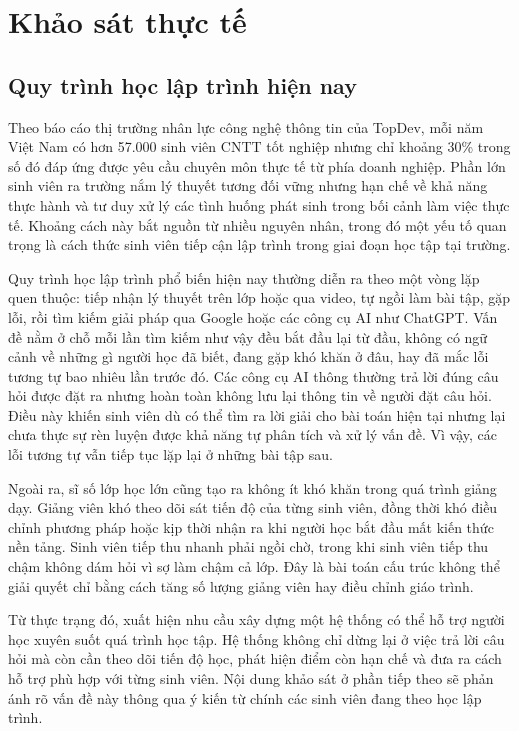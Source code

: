 \documentclass[../main.tex]{subfiles}
\begin{document}
\section{Khảo sát thực tế}

\subsection{Quy trình học lập trình hiện nay}

Theo báo cáo thị trường nhân lực công nghệ thông tin của TopDev, mỗi năm Việt Nam có hơn 57.000 sinh viên CNTT tốt nghiệp nhưng chỉ khoảng 30\% trong số đó đáp ứng được yêu cầu chuyên môn thực tế từ phía doanh nghiệp. Phần lớn sinh viên ra trường nắm lý thuyết tương đối vững nhưng hạn chế về khả năng thực hành và tư duy xử lý các tình huống phát sinh trong bối cảnh làm việc thực tế. Khoảng cách này bắt nguồn từ nhiều nguyên nhân, trong đó một yếu tố quan trọng là cách thức sinh viên tiếp cận lập trình trong giai đoạn học tập tại trường.

Quy trình học lập trình phổ biến hiện nay thường diễn ra theo một vòng lặp quen thuộc: tiếp nhận lý thuyết trên lớp hoặc qua video, tự ngồi làm bài tập, gặp lỗi, rồi tìm kiếm giải pháp qua Google hoặc các công cụ AI như ChatGPT. Vấn đề nằm ở chỗ mỗi lần tìm kiếm như vậy đều bắt đầu lại từ đầu, không có ngữ cảnh về những gì người học đã biết, đang gặp khó khăn ở đâu, hay đã mắc lỗi tương tự bao nhiêu lần trước đó. Các công cụ AI thông thường trả lời đúng câu hỏi được đặt ra nhưng hoàn toàn không lưu lại thông tin về người đặt câu hỏi. Điều này khiến sinh viên dù có thể tìm ra lời giải cho bài toán hiện tại nhưng lại chưa thực sự rèn luyện được khả năng tự phân tích và xử lý vấn đề. Vì vậy, các lỗi tương tự vẫn tiếp tục lặp lại ở những bài tập sau.

Ngoài ra, sĩ số lớp học lớn cũng tạo ra không ít khó khăn trong quá trình giảng dạy. Giảng viên khó theo dõi sát tiến độ của từng sinh viên, đồng thời khó điều chỉnh phương pháp hoặc kịp thời nhận ra khi người học bắt đầu mất kiến thức nền tảng. Sinh viên tiếp thu nhanh phải ngồi chờ, trong khi sinh viên tiếp thu chậm không dám hỏi vì sợ làm chậm cả lớp. Đây là bài toán cấu trúc không thể giải quyết chỉ bằng cách tăng số lượng giảng viên hay điều chỉnh giáo trình.

Từ thực trạng đó, xuất hiện nhu cầu xây dựng một hệ thống có thể hỗ trợ người học xuyên suốt quá trình học tập. Hệ thống không chỉ dừng lại ở việc trả lời câu hỏi mà còn cần theo dõi tiến độ học, phát hiện điểm còn hạn chế và đưa ra cách hỗ trợ phù hợp với từng sinh viên. Nội dung khảo sát ở phần tiếp theo sẽ phản ánh rõ vấn đề này thông qua ý kiến từ chính các sinh viên đang theo học lập trình.
\end{document}
